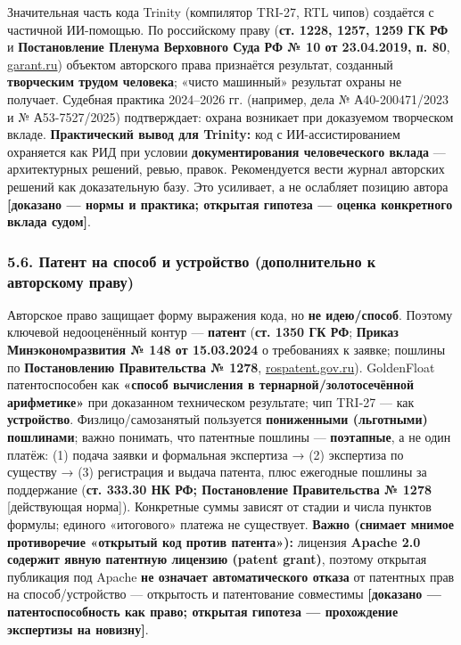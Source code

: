 \documentclass[
  russian,
]{article}
\begin{document}
Значительная часть кода Trinity (компилятор TRI-27, RTL чипов) создаётся
с частичной ИИ-помощью. По российскому праву (\textbf{ст. 1228, 1257,
1259 ГК РФ} и \textbf{Постановление Пленума Верховного Суда РФ № 10 от
23.04.2019, п. 80}, \href{https://base.garant.ru/58074501/}{garant.ru})
объектом авторского права признаётся результат, созданный
\textbf{творческим трудом человека}; «чисто машинный» результат охраны
не получает. Судебная практика 2024--2026 гг. (например, дела №
А40-200471/2023 и № А53-7527/2025) подтверждает: охрана возникает при
доказуемом творческом вкладе. \textbf{Практический вывод для Trinity:}
код с ИИ-ассистированием охраняется как РИД при условии
\textbf{документирования человеческого вклада} --- архитектурных
решений, ревью, правок. Рекомендуется вести журнал авторских решений как
доказательную базу. Это усиливает, а не ослабляет позицию автора
\textbf{{[}доказано --- нормы и практика; открытая гипотеза --- оценка
конкретного вклада судом{]}}.

\subsubsection{5.6. Патент на способ и устройство (дополнительно к
авторскому
праву)}\label{ux43fux430ux442ux435ux43dux442-ux43dux430-ux441ux43fux43eux441ux43eux431-ux438-ux443ux441ux442ux440ux43eux439ux441ux442ux432ux43e-ux434ux43eux43fux43eux43bux43dux438ux442ux435ux43bux44cux43dux43e-ux43a-ux430ux432ux442ux43eux440ux441ux43aux43eux43cux443-ux43fux440ux430ux432ux443}

Авторское право защищает форму выражения кода, но \textbf{не
идею/способ}. Поэтому ключевой недооценённый контур --- \textbf{патент}
(\textbf{ст. 1350 ГК РФ}; \textbf{Приказ Минэкономразвития № 148 от
15.03.2024} о требованиях к заявке; пошлины по \textbf{Постановлению
Правительства № 1278},
\href{https://rospatent.gov.ru/ru/activities/dues/table}{rospatent.gov.ru}).
GoldenFloat патентоспособен как \textbf{«способ вычисления в
тернарной/золотосечённой арифметике»} при доказанном техническом
результате; чип TRI-27 --- как \textbf{устройство}. Физлицо/самозанятый
пользуется \textbf{пониженными (льготными) пошлинами}; важно понимать,
что патентные пошлины --- \textbf{поэтапные}, а не один платёж: (1)
подача заявки и формальная экспертиза → (2) экспертиза по существу → (3)
регистрация и выдача патента, плюс ежегодные пошлины за поддержание
(\textbf{ст. 333.30 НК РФ; Постановление Правительства № 1278}
{[}действующая норма{]}). Конкретные суммы зависят от стадии и числа
пунктов формулы; единого «итогового» платежа не существует.
\textbf{Важно (снимает мнимое противоречие «открытый код против
патента»):} лицензия \textbf{Apache 2.0 содержит явную патентную
лицензию (patent grant)}, поэтому открытая публикация под Apache
\textbf{не означает автоматического отказа} от патентных прав на
способ/устройство --- открытость и патентование совместимы
\textbf{{[}доказано --- патентоспособность как право; открытая гипотеза
--- прохождение экспертизы на новизну{]}}.
\end{document}
